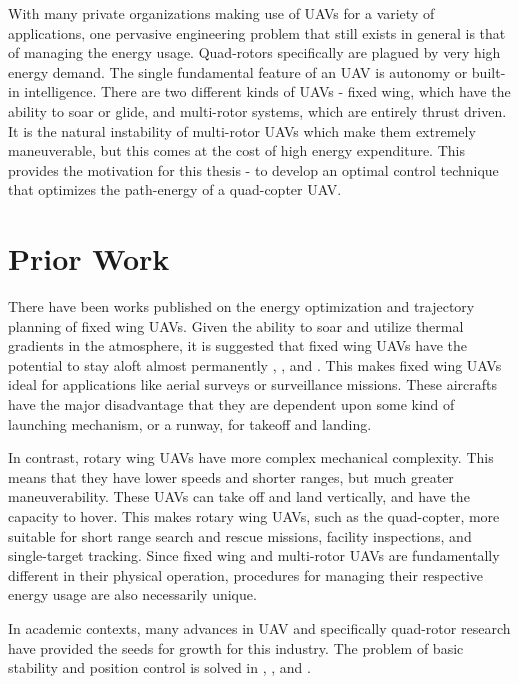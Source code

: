 With many private organizations making use of UAVs for a variety of applications, one pervasive engineering problem that still exists in general is that of managing the energy usage. Quad-rotors specifically are plagued by very high energy demand. The single fundamental feature of an UAV is autonomy or built-in intelligence. There are two different kinds of UAVs - fixed wing, which have the ability to soar or glide, and multi-rotor systems, which are entirely thrust driven. It is the natural instability of multi-rotor UAVs which make them extremely maneuverable, but this comes at the cost of high energy expenditure. This provides the motivation for this thesis - to develop an optimal control technique that optimizes the path-energy of a quad-copter UAV.


\section{Prior Work}

There have been works published on the energy optimization and trajectory planning of fixed wing UAVs. Given the ability to soar and utilize thermal gradients in the atmosphere, it is suggested that fixed wing UAVs have the potential to stay aloft almost permanently \cite{langelaan2007long}, \cite{klesh2009solar}, and \cite{lawrance2009guidance}.  This makes fixed wing UAVs ideal for applications like aerial surveys or surveillance missions. These aircrafts have the major disadvantage that they are dependent upon some kind of launching mechanism, or a runway, for takeoff and landing. 

In contrast, rotary wing UAVs have more complex mechanical complexity. This means that they have lower speeds and shorter ranges, but much greater maneuverability. These UAVs can take off and land vertically, and have the capacity to hover. This makes rotary wing UAVs, such as the quad-copter, more suitable for short range search and rescue missions, facility inspections, and single-target tracking. Since fixed wing and multi-rotor UAVs are fundamentally different in their physical operation, procedures for managing their respective energy usage are also necessarily unique.

In academic contexts, many advances in UAV and specifically quad-rotor research have provided the seeds for growth for this industry. The problem of basic stability and position control is solved in \cite{erginer2007modeling}, \cite{bouabdallah2004pid}, and \cite{Luukkonen}. 


